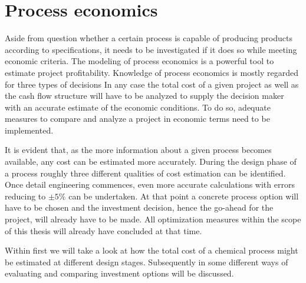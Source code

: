\chapter{Process economics}
\label{chp:ProcesEconomics}

Aside from question whether a certain process is capable of producing products according to
specifications, it needs to be investigated if it does so while meeting economic criteria. The modeling
of process economics is a powerful tool to estimate project profitability. Knowledge of process economics
is mostly regarded for three types of decisions
%
In any case the total cost of a given project as well as the cash flow structure will have to be analyzed to supply
the decision maker with an accurate estimate of the economic conditions. To do so, adequate measures to compare and
analyze a project in economic terms need to be implemented.

It is evident that, as the more information about a given process becomes available, any cost can be estimated
more accurately. During the design phase of a process roughly three different qualities of cost estimation can be identified.
Once detail engineering commences, even more accurate calculations with errors reducing to $\pm 5\%$
can be undertaken\cite{Peters.2003}. At that point a concrete process option will have to be chosen and
the investment decision, hence the go-ahead for the project,  will already have to be made. All optimization
measures within the scope of this thesis will already have concluded at that time.

Within  first we will take a look at how the total cost of a chemical process might be
estimated at different design stages. Subsequently in  some different ways
of evaluating and comparing investment options will be discussed.

